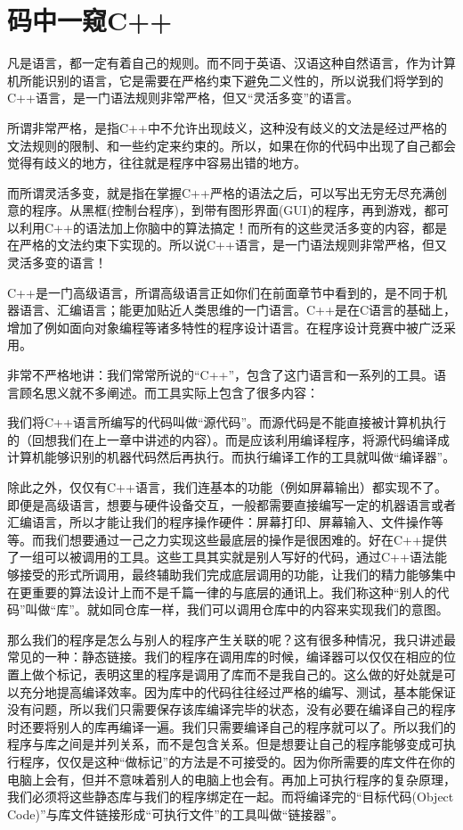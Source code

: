 \chapter{码中一窥C++}

凡是语言，都一定有着自己的规则。而不同于英语、汉语这种自然语言，作为计算机所能识别的语言，它是需要在严格约束下避免二义性的，所以说我们将学到的C++语言，是一门语法规则非常严格，但又“灵活多变”的语言。

所谓非常严格，是指C++中不允许出现歧义，这种没有歧义的文法是经过严格的文法规则的限制、和一些约定来约束的。所以，如果在你的代码中出现了自己都会觉得有歧义的地方，往往就是程序中容易出错的地方。

而所谓灵活多变，就是指在掌握C++严格的语法之后，可以写出无穷无尽充满创意的程序。从黑框(控制台程序)，到带有图形界面(GUI)的程序，再到游戏，都可以利用C++的语法加上你脑中的算法搞定！而所有的这些灵活多变的内容，都是在严格的文法约束下实现的。所以说C++语言，是一门语法规则非常严格，但又灵活多变的语言！

C++是一门高级语言，所谓高级语言正如你们在前面章节中看到的，是不同于机器语言、汇编语言；能更加贴近人类思维的一门语言。C++是在C语言的基础上，增加了例如面向对象编程等诸多特性的程序设计语言。在程序设计竞赛中被广泛采用。

非常不严格地讲：我们常常所说的“C++”，包含了这门语言和一系列的工具。语言顾名思义就不多阐述。而工具实际上包含了很多内容：

我们将C++语言所编写的代码叫做“源代码”。而源代码是不能直接被计算机执行的（回想我们在上一章中讲述的内容）。而是应该利用编译程序，将源代码编译成计算机能够识别的机器代码然后再执行。而执行编译工作的工具就叫做“编译器”。

除此之外，仅仅有C++语言，我们连基本的功能（例如屏幕输出）都实现不了。即便是高级语言，想要与硬件设备交互，一般都需要直接编写一定的机器语言或者汇编语言，所以才能让我们的程序操作硬件：屏幕打印、屏幕输入、文件操作等等。而我们想要通过一己之力实现这些最底层的操作是很困难的。好在C++提供了一组可以被调用的工具。这些工具其实就是别人写好的代码，通过C++语法能够接受的形式所调用，最终辅助我们完成底层调用的功能，让我们的精力能够集中在更重要的算法设计上而不是千篇一律的与底层的通讯上。我们称这种“别人的代码”叫做“库”。就如同仓库一样，我们可以调用仓库中的内容来实现我们的意图。

那么我们的程序是怎么与别人的程序产生关联的呢？这有很多种情况，我只讲述最常见的一种：静态链接。我们的程序在调用库的时候，编译器可以仅仅在相应的位置上做个标记，表明这里的程序是调用了库而不是我自己的。这么做的好处就是可以充分地提高编译效率。因为库中的代码往往经过严格的编写、测试，基本能保证没有问题，所以我们只需要保存该库编译完毕的状态，没有必要在编译自己的程序时还要将别人的库再编译一遍。我们只需要编译自己的程序就可以了。所以我们的程序与库之间是并列关系，而不是包含关系。但是想要让自己的程序能够变成可执行程序，仅仅是这种“做标记”的方法是不可接受的。因为你所需要的库文件在你的电脑上会有，但并不意味着别人的电脑上也会有。再加上可执行程序的复杂原理，我们必须将这些静态库与我们的程序绑定在一起。而将编译完的“目标代码(Object Code)”与库文件链接形成“可执行文件”的工具叫做“链接器”。

